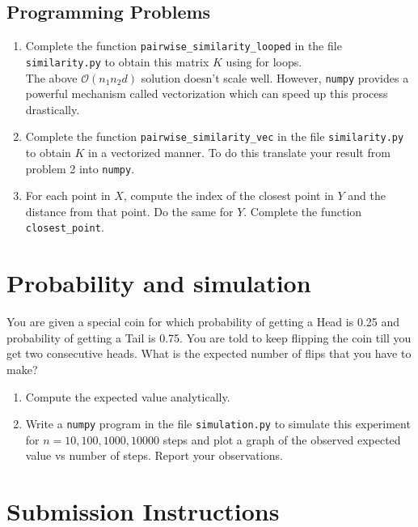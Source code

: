 \documentclass{article}
\begin{document}
\subsection{Programming Problems}
\begin{enumerate}[leftmargin=*, label=(\alph*)]
\item Complete the function \texttt{pairwise\_similarity\_looped} in the file \texttt{similarity.py} to obtain this matrix $K$ using for loops. \\

The above $\mathcal{O}(n_1 n_2 d)$ solution doesn't scale well. However, \texttt{numpy} provides a powerful mechanism called vectorization which can speed up this process drastically. \\

\item Complete the function \texttt{pairwise\_similarity\_vec} in the file \texttt{similarity.py} to obtain $K$ in a vectorized manner. To do this translate your result from problem 2 into \texttt{numpy}.

\item For each point in $X$, compute the index of the closest point in $Y$ and the distance from that point. Do the same for $Y$. Complete the function
\texttt{closest\_point}.
\end{enumerate}


\section{Probability and simulation}

You are given a special coin for which probability of getting a Head is 0.25 and probability of getting a Tail is 0.75. You are told to keep flipping the coin till you get two consecutive heads. What is the expected number of flips that you have to make? 
\begin{enumerate}[leftmargin=*, label=(\alph*)]
    \item Compute the expected value  analytically.
    \item Write a \texttt{numpy} program in the file \texttt{simulation.py} to simulate this experiment for $n=10,100,1000,10000$ steps and plot a graph of the observed expected value vs number of steps. Report your observations.
\end{enumerate}

\section*{Submission Instructions}
\end{document}
